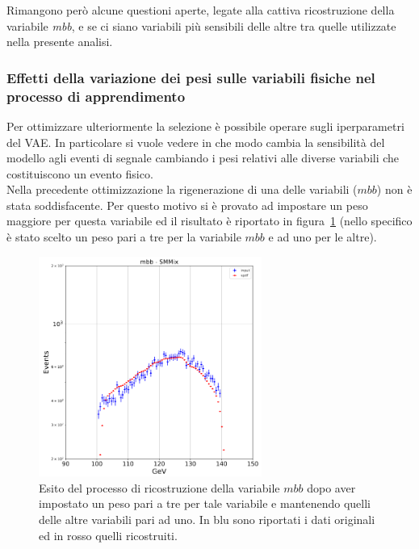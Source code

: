 Rimangono però alcune questioni aperte, legate alla cattiva ricostruzione della variabile \textit{mbb}, e se ci siano variabili più sensibili delle altre tra quelle utilizzate nella presente analisi.

\newpage

\subsubsection{Effetti della variazione dei pesi sulle variabili fisiche nel processo di apprendimento}
\label{effetti variazione pesi}

Per ottimizzare ulteriormente la selezione è possibile operare sugli iperparametri del VAE. In particolare si vuole vedere in che modo cambia la sensibilità del modello agli eventi di segnale cambiando i pesi relativi alle diverse variabili che costituiscono un evento fisico.\\
Nella precedente ottimizzazione la rigenerazione di una delle variabili ($\textit{mbb}$) non è stata soddisfacente. Per questo motivo si è provato ad impostare un peso maggiore per questa variabile ed il risultato è riportato in figura~\ref{mbb_ottimizzazione} (nello specifico è stato scelto un peso pari a tre per la variabile $\textit{mbb}$ e ad uno per le altre).

\begin{figure}[h!]
	\centering
	\includegraphics[width=0.65\textwidth]{figs/risultati_simulazione/verifica_mbb.png}
	\caption{Esito del processo di ricostruzione della variabile $\textit{mbb}$ dopo aver impostato un peso pari a tre per tale variabile e mantenendo quelli delle altre variabili pari ad uno. In blu sono riportati i dati originali ed in rosso quelli ricostruiti.}
	\label{mbb_ottimizzazione}
\end{figure}

